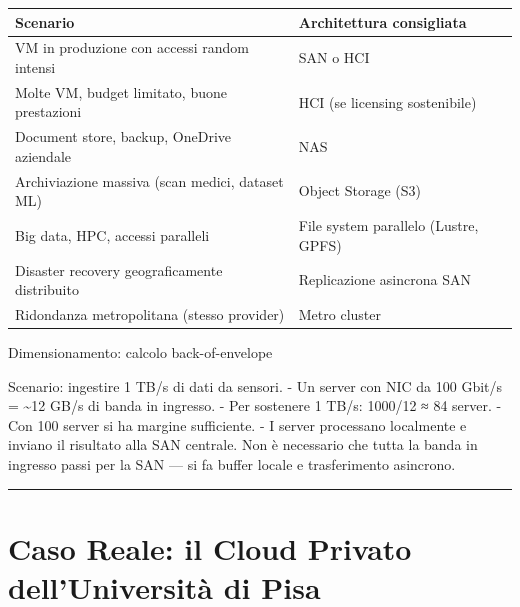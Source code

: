 \documentclass[
  italian,
  openany]{book}
\newcounter{none} %
\begin{document}
{\def\LTcaptype{none} %
\begin{longtable}[]{@{}
  >{\raggedright\arraybackslash}p{}
  >{\raggedright\arraybackslash}p{}@{}}
\toprule\noalign{}
\begin{minipage}[b]{\linewidth}\raggedright
Scenario
\end{minipage} & \begin{minipage}[b]{\linewidth}\raggedright
Architettura consigliata
\end{minipage} \\
\midrule\noalign{}
\endhead
\bottomrule\noalign{}
\endlastfoot
VM in produzione con accessi random intensi & SAN o HCI \\
Molte VM, budget limitato, buone prestazioni & HCI (se licensing
sostenibile) \\
Document store, backup, OneDrive aziendale & NAS \\
Archiviazione massiva (scan medici, dataset ML) & Object Storage (S3) \\
Big data, HPC, accessi paralleli & File system parallelo (Lustre,
GPFS) \\
Disaster recovery geograficamente distribuito & Replicazione asincrona
SAN \\
Ridondanza metropolitana (stesso provider) & Metro cluster \\
\end{longtable}
}

\begin{callouttip}{Dimensionamento: calcolo back-of-envelope}

Scenario: ingestire 1 TB/s di dati da sensori. - Un server con NIC da
100 Gbit/s = \textasciitilde12 GB/s di banda in ingresso. - Per
sostenere 1 TB/s: 1000/12 ≈ 84 server. - Con 100 server si ha margine
sufficiente. - I server processano localmente e inviano il risultato
alla SAN centrale. Non è necessario che tutta la banda in ingresso passi
per la SAN --- si fa buffer locale e trasferimento asincrono.

\end{callouttip}

\begin{center}\rule{0.5\linewidth}{0.5pt}\end{center}

\section{Caso Reale: il Cloud Privato dell'Università di
Pisa}\label{caso-reale-il-cloud-privato-delluniversituxe0-di-pisa}
\end{document}
